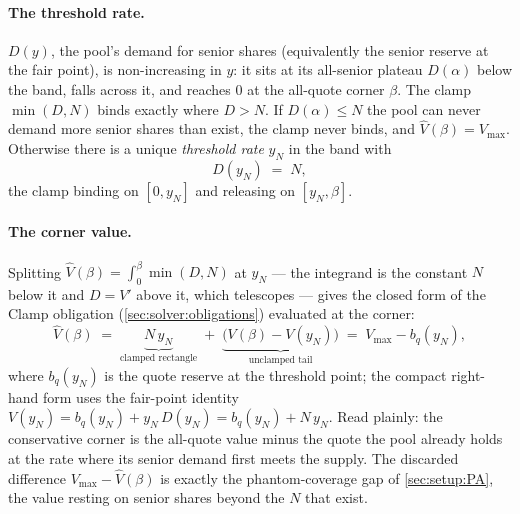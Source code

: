 \paragraph{The threshold rate.}
$D(y)$, the pool's demand for senior shares (equivalently the senior
reserve at the fair point), is non-increasing in $y$: it sits at its
all-senior plateau $D(\alpha)$ below the band, falls across it, and reaches
$0$ at the all-quote corner $\beta$. The clamp $\min(D, N)$ binds exactly
where $D > N$. If $D(\alpha) \leq N$ the pool can never demand more senior
shares than exist, the clamp never binds, and $\widehat{V}(\beta) =
V_{\max}$. Otherwise there is a unique \emph{threshold rate} $y_N$ in the
band with
\[
  D(y_N) \;=\; N,
\]
the clamp binding on $[0, y_N]$ and releasing on $[y_N, \beta]$.

\paragraph{The corner value.}
Splitting $\widehat{V}(\beta) = \int_0^\beta \min(D, N)$ at $y_N$ --- the
integrand is the constant $N$ below it and $D = V'$ above it, which
telescopes --- gives the closed form of the Clamp obligation
(\cref{sec:solver:obligations}) evaluated at the corner:
\begin{equation}
  \widehat{V}(\beta)
    \;=\; \underbrace{N\,y_N}_{\text{clamped rectangle}}
        \;+\; \underbrace{\bigl(V(\beta) - V(y_N)\bigr)}_{\text{unclamped tail}}
    \;=\; V_{\max} - b_q(y_N),
  \label{eq:vhat-beta}
\end{equation}
where $b_q(y_N)$ is the quote reserve at the threshold point; the compact
right-hand form uses the fair-point identity
$V(y_N) = b_q(y_N) + y_N\,D(y_N) = b_q(y_N) + N\,y_N$. Read plainly: the
conservative corner is the all-quote value minus the quote the pool already
holds at the rate where its senior demand first meets the supply. The
discarded difference $V_{\max} - \widehat{V}(\beta)$ is exactly the
phantom-coverage gap of \cref{sec:setup:PA}, the value resting on senior
shares beyond the $N$ that exist.

